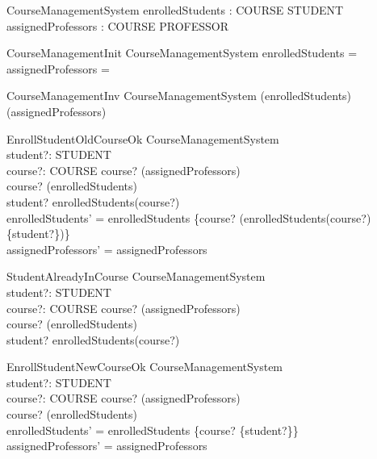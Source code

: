 \begin{zed}
\end{zed}

\begin{schema}{CourseManagementSystem}
    enrolledStudents : COURSE \pfun \power STUDENT \\
    assignedProfessors : COURSE \pfun \power PROFESSOR
\end{schema}

\begin{schema}{CourseManagementInit}
    CourseManagementSystem
    \where 
    enrolledStudents = \emptyset \\
    assignedProfessors = \emptyset
\end{schema}

\begin{schema}{CourseManagementInv}
    CourseManagementSystem
    \where
    \dom(enrolledStudents) \subseteq \dom(assignedProfessors) 
\end{schema}

\begin{schema}{EnrollStudentOldCourseOk}
    \Delta CourseManagementSystem \\
    student?: STUDENT \\
    course?: COURSE
    \where
    course? \in \dom(assignedProfessors) \\
    course? \in \dom(enrolledStudents) \\
    student? \notin enrolledStudents(course?) \\
    enrolledStudents' = enrolledStudents \oplus \{course? \mapsto (enrolledStudents(course?) \cup \{student?\})\} \\
    assignedProfessors' = assignedProfessors
\end{schema}

\begin{schema}{StudentAlreadyInCourse}
\Xi CourseManagementSystem \\
student?: STUDENT \\
course?: COURSE
\where
    course? \in \dom(assignedProfessors) \\
    course? \in \dom(enrolledStudents) \\
    student? \in enrolledStudents(course?)
\end{schema}

\begin{schema}{EnrollStudentNewCourseOk}
    \Delta CourseManagementSystem \\
    student?: STUDENT \\
    course?: COURSE
    \where
    course? \in \dom(assignedProfessors) \\
    course? \notin \dom(enrolledStudents) \\
    enrolledStudents' = enrolledStudents \cup \{course? \mapsto \{student?\}\} \\
    assignedProfessors' = assignedProfessors
\end{schema}

